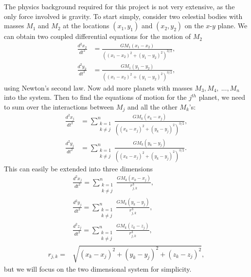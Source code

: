 \documentclass[prb,aps,twocolumn,showpacs,10pt]{revtex4-1}
\begin{document}
The physics background required for this project is not very extensive, as the only force involved is gravity. To start simply, consider two celestial bodies with masses $M_1$ and $M_2$ at the locations $(x_1,y_1)$ and $(x_2,y_2)$ on the $x$-$y$ plane. We can obtain two coupled differential equations for the motion of $M_2$
\begin{equation}
\begin{split}
\frac{d^2x_2}{dt^2} &= \frac{GM_1(x_1-x_2)}{((x_1-x_2)^2+(y_1-y_2)^2)^{3/2}},\\
\frac{d^2y_2}{dt^2} &= \frac{GM_1(y_1-y_2)}{((x_1-x_2)^2+(y_1-y_2)^2)^{3/2}},
\end{split}
\end{equation}
\noindent using Newton's second law. Now add more planets with masses $M_3, M_4, \ ..., M_n$ into the system. Then to find the equations of motion for the $j^{th}$ planet, we need to sum over the interactions between $M_j$ and all the other $M_k$'s:
\begin{equation}
\begin{split}
\frac{d^2x_j}{dt^2} &= \sum_{\substack{{k = 1}\\k \neq j}}^n \frac{GM_k(x_k-x_j)}{((x_k-x_j)^2+(y_k-y_j)^2)^{3/2}},\\
\frac{d^2y_j}{dt^2} &= \sum_{\substack{{k = 1}\\k \neq j}}^n \frac{GM_k(y_k-y_j)}{((x_k-x_j)^2+(y_k-y_j)^2)^{3/2}}.
\end{split}
\end{equation}
\noindent This can easily be extended into three dimensions
\begin{equation}
\begin{split}
&\frac{d^2x_j}{dt^2} = \sum_{\substack{{k = 1}\\k \neq j}}^n \frac{GM_k(x_k-x_j)}{r_{j,k}^3},\\
&\frac{d^2y_j}{dt^2} = \sum_{\substack{{k = 1}\\k \neq j}}^n \frac{GM_k(y_k-y_j)}{r_{j,k}^3},\\
&\frac{d^2z_j}{dt^2} = \sum_{\substack{{k = 1}\\k \neq j}}^n \frac{GM_k(z_k-z_j)}{r_{j,k}^3},\\
r_{j,k} = &\sqrt{(x_k-x_j)^2+(y_k-y_j)^2+(z_k-z_j)^2},
\end{split}
\end{equation}
but we will focus on the two dimensional system for simplicity. 
\end{document}
